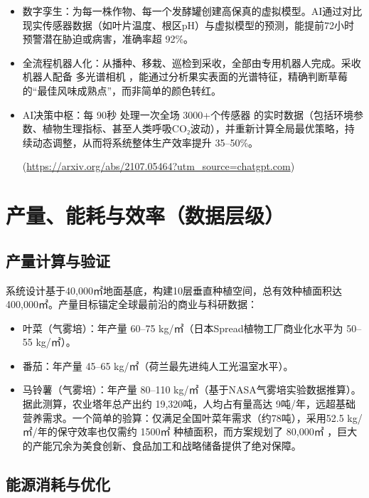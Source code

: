 \begin{itemize}
\item
  数字孪生：为每一株作物、每一个发酵罐创建高保真的虚拟模型。AI通过对比现实传感器数据（如叶片温度、根区pH）与虚拟模型的预测，能提前72小时预警潜在胁迫或病害，准确率超 92\%。
\item
  全流程机器人化：从播种、移栽、巡检到采收，全部由专用机器人完成。采收机器人配备 多光谱相机 ，能通过分析果实表面的光谱特征，精确判断草莓的``最佳风味成熟点''，而非简单的颜色转红。
\item
  AI决策中枢：每 90秒 处理一次全场 3000+个传感器 的实时数据（包括环境参数、植物生理指标、甚至人类呼吸CO₂波动），并重新计算全局最优策略，持续动态调整，从而将系统整体生产效率提升 35--50\%。

(\url{https://arxiv.org/abs/2107.05464?utm\_source=chatgpt.com})
\end{itemize}

\section{产量、能耗与效率（数据层级）}\label{ux4ea7ux91cfux80fdux8017ux4e0eux6548ux7387ux6570ux636eux5c42ux7ea7}

\subsection{产量计算与验证}\label{ux4ea7ux91cfux8ba1ux7b97ux4e0eux9a8cux8bc1}

系统设计基于40,000㎡地面基底，构建10层垂直种植空间，总有效种植面积达 400,000㎡。产量目标锚定全球最前沿的商业与科研数据：

\begin{itemize}
\item
  叶菜（气雾培）：年产量 60--75 kg/㎡（日本Spread植物工厂商业化水平为 50--55 kg/㎡）。
\item
  番茄：年产量 45--65 kg/㎡（荷兰最先进纯人工光温室水平）。
\item
  马铃薯（气雾培）：年产量 80--110 kg/㎡（基于NASA气雾培实验数据推算）。
  据此测算，农业塔年总产出约 19,320吨，人均占有量高达 9吨/年，远超基础营养需求。一个简单的验算：仅满足全国叶菜年需求（约78吨），采用52.5 kg/㎡/年的保守效率也仅需约 1500㎡ 种植面积，而方案规划了 80,000㎡ ，巨大的产能冗余为美食创新、食品加工和战略储备提供了绝对保障。
\end{itemize}

\subsection{能源消耗与优化}\label{ux80fdux6e90ux6d88ux8017ux4e0eux4f18ux5316}

